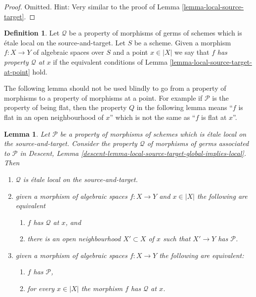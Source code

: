 \documentclass{stacks-project}
\theoremstyle{plain}
\newtheorem{lemma}[subsection]{Lemma}
\theoremstyle{definition}
\newtheorem{definition}[subsection]{Definition}
\theoremstyle{remark}
\numberwithin{equation}{subsection}
\begin{document}
\begin{proof}
Omitted. Hint: Very similar to the proof of
Lemma \ref{lemma-local-source-target}.
\end{proof}

\begin{definition}
\label{definition-P-at-point}
Let $\mathcal{Q}$ be a property of morphisms of germs
of schemes which is \'etale local on the source-and-target.
Let $S$ be a scheme.
Given a morphism $f : X \to Y$ of algebraic spaces over $S$ and
a point $x \in |X|$ we say that $f$
{\it has property $\mathcal{Q}$ at $x$} if the equivalent conditions of
Lemma \ref{lemma-local-source-target-at-point}
hold.
\end{definition}

\noindent
The following lemma should not be used blindly to go from a property of
morphisms to a property of morphisms at a point. For example if
$\mathcal{P}$ is the property of being flat, then the property
$Q$ in the following lemma means ``$f$ is flat in an open neighbourhood
of $x$'' which is not the same as ``$f$ is flat at $x$''.

\begin{lemma}
\label{lemma-local-source-target-global-implies-local}
Let $\mathcal{P}$ be a property of morphisms of schemes
which is \'etale local on the source-and-target.
Consider the property $\mathcal{Q}$ of morphisms
of germs associated to $\mathcal{P}$ in
Descent, Lemma \ref{descent-lemma-local-source-target-global-implies-local}.
Then
\begin{enumerate}
\item $\mathcal{Q}$ is \'etale local on the source-and-target.
\item given a morphism of algebraic spaces $f : X \to Y$ and $x \in |X|$
the following are equivalent
\begin{enumerate}
\item $f$ has $\mathcal{Q}$ at $x$, and
\item there is an open neighbourhood $X' \subset X$ of $x$
such that $X' \to Y$ has $\mathcal{P}$.
\end{enumerate}
\item given a morphism of algebraic spaces $f : X \to Y$
the following are equivalent:
\begin{enumerate}
\item $f$ has $\mathcal{P}$,
\item for every $x \in |X|$ the morphism $f$ has $\mathcal{Q}$ at $x$.
\end{enumerate}
\end{enumerate}
\end{lemma}
\end{document}
